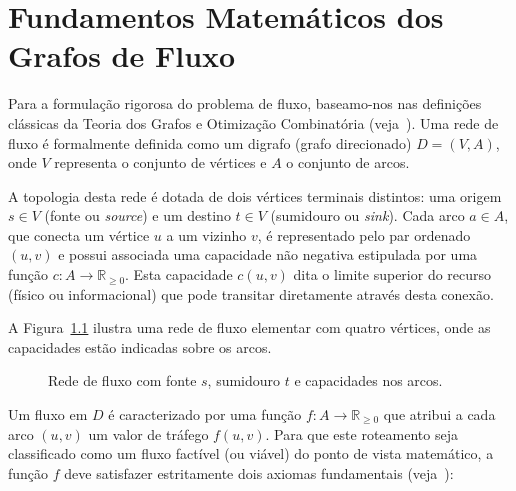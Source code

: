 \chapter{Fundamentos Matemáticos dos Grafos de Fluxo}\label{sec:base_matematica}

Para a formulação rigorosa do problema de fluxo, baseamo-nos nas definições clássicas da Teoria dos Grafos e Otimização Combinatória (veja~\cite{ahuja1993network, bondy2008graph}). Uma rede de fluxo é formalmente definida como um digrafo (grafo direcionado) $D = (V, A)$, onde $V$ representa o conjunto de vértices e $A$ o conjunto de arcos.

A topologia desta rede é dotada de dois vértices terminais distintos: uma origem $s \in V$ (fonte ou \textit{source}) e um destino $t \in V$ (sumidouro ou \textit{sink}). Cada arco $a \in A$, que conecta um vértice $u$ a um vizinho $v$, é representado pelo par ordenado $(u,v)$ e possui associada uma capacidade não negativa estipulada por uma função $c: A \rightarrow \mathbb{R}_{\ge 0}$. Esta capacidade $c(u,v)$ dita o limite superior do recurso (físico ou informacional) que pode transitar diretamente através desta conexão.

A Figura~\ref{fig:rede_fluxo} ilustra uma rede de fluxo elementar com quatro vértices, onde as capacidades estão indicadas sobre os arcos.

\begin{figure}[!ht]
\centering
{}
\caption{Rede de fluxo com fonte $s$, sumidouro $t$ e capacidades nos arcos.}
\label{fig:rede_fluxo}
\end{figure}

Um fluxo em $D$ é caracterizado por uma função $f: A \rightarrow \mathbb{R}_{\ge 0}$ que atribui a cada arco $(u,v)$ um valor de tráfego $f(u,v)$. Para que este roteamento seja classificado como um fluxo factível (ou viável) do ponto de vista matemático, a função $f$ deve satisfazer estritamente dois axiomas fundamentais (veja~\cite{ford1956maximal, cook1998combinatorial}):

